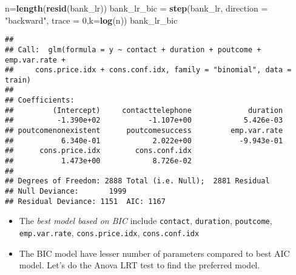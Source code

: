 \documentclass[
]{article}
\newenvironment{Shaded}{\begin{snugshade}}{\end{snugshade}}
\newcommand{\DataTypeTok}[1]{\textcolor[rgb]{0.13,0.29,0.53}{#1}}
\newcommand{\DecValTok}[1]{\textcolor[rgb]{0.00,0.00,0.81}{#1}}
\newcommand{\KeywordTok}[1]{\textcolor[rgb]{0.13,0.29,0.53}{\textbf{#1}}}
\newcommand{\NormalTok}[1]{#1}
\newcommand{\StringTok}[1]{\textcolor[rgb]{0.31,0.60,0.02}{#1}}
\begin{document}
\begin{Shaded}
\begin{Highlighting}[]
\NormalTok{n=}\KeywordTok{length}\NormalTok{(}\KeywordTok{resid}\NormalTok{(bank_lr))}
\NormalTok{bank_lr_bic =}\StringTok{ }\KeywordTok{step}\NormalTok{(bank_lr, }\DataTypeTok{direction =} \StringTok{"backward"}\NormalTok{, }\DataTypeTok{trace =} \DecValTok{0}\NormalTok{,}\DataTypeTok{k=}\KeywordTok{log}\NormalTok{(n))}
\NormalTok{bank_lr_bic}
\end{Highlighting}
\end{Shaded}

\begin{verbatim}
## 
## Call:  glm(formula = y ~ contact + duration + poutcome + emp.var.rate + 
##     cons.price.idx + cons.conf.idx, family = "binomial", data = train)
## 
## Coefficients:
##         (Intercept)     contacttelephone             duration  
##          -1.390e+02           -1.107e+00            5.426e-03  
## poutcomenonexistent      poutcomesuccess         emp.var.rate  
##           6.340e-01            2.022e+00           -9.943e-01  
##      cons.price.idx        cons.conf.idx  
##           1.473e+00            8.726e-02  
## 
## Degrees of Freedom: 2888 Total (i.e. Null);  2881 Residual
## Null Deviance:       1999 
## Residual Deviance: 1151  AIC: 1167
\end{verbatim}

\begin{itemize}
\item
  The \emph{best model based on BIC} include \texttt{contact},
  \texttt{duration}, \texttt{poutcome}, \texttt{emp.var.rate},
  \texttt{cons.price.idx}, \texttt{cons.conf.idx}
\item
  The BIC model have lesser number of parameters compared to best AIC
  model. Let's do the Anova LRT test to find the preferred model.
\end{itemize}
\end{document}
